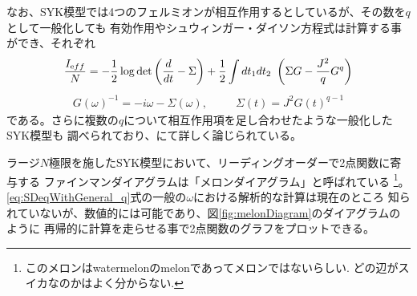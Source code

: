 なお、SYK模型では4つのフェルミオンが相互作用するとしているが、その数を$q$として一般化しても
有効作用やシュウィンガー・ダイソン方程式は計算する事ができ、それぞれ
\begin{align}
  \frac{I_{\mathrm eff}}{N} =
		- \frac{1}{2}\log\det\left(\frac{d}{dt} - \Sigma\right)
		+ \frac{1}{2}\int dt_1dt_2\ \left(\Sigma G - \frac{J^2}{q}G^q\right)
  \label{eq:effectiveActionWithGeneral_q}
\end{align}
\begin{align}
  G(\omega)^{-1} = -i\omega - \Sigma(\omega),
  \hspace{30pt}
  \Sigma(t) = J^2G(t)^{q-1}
  \label{eq:SDeqWithGeneral_q}
\end{align}
である。さらに複数の$q$について相互作用項を足し合わせたような一般化したSYK模型も
調べられており、\cite{gross}にて詳しく論じられている。

ラージ$N$極限を施したSYK模型において、リーディングオーダーで2点関数に寄与する
ファインマンダイアグラムは「メロンダイアグラム」と呼ばれている
\footnote{このメロンはwatermelonのmelonであってメロンではないらしい.
どの辺がスイカなのかはよく分からない.}。
\eqref{eq:SDeqWithGeneral_q}式の一般の$\omega$における解析的な計算は現在のところ
知られていないが、数値的には可能であり、図\ref{fig:melonDiagram}のダイアグラムのように
再帰的に計算を走らせる事で2点関数のグラフをプロットできる。

